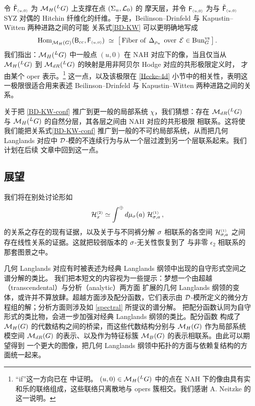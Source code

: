 令 $\check{\mathsf{F}}_{\scriptscriptstyle(u,0)}$ 为 $\mathcal{M}_{H}({}^LG)$ 上支撑在点 $(\Sigma_u,\mathcal{L}_0)$ 的
摩天层，并令 $\mathsf{F}_{\scriptscriptstyle (u,0)}$ 为与 $\check{\mathsf{F}}_{\scriptscriptstyle(u,0)}$ SYZ 对偶的
Hitchin 纤维化的纤维。于是，Beilinson--Drinfeld 与 Kapustin--Witten 两种进路之间的可能
关系式\eqref{BD-KW} 可以更明确地写成
\begin{equation} \label{BD-KW-conf}
{\rm Hom}_{\mathcal{M}_H(G)}^{}(\mathsf{B}_{\rm cc},\mathsf{F}_{\scriptscriptstyle (u,0)})
\;\simeq\;
\big[\,
\text{Fiber of}\;\, \Delta_{\rho_u}\;\,\text{over}\;\,\mathcal{E}\in\mathrm{Bun}_G^{\rm vs}\,\big]\,.
\end{equation}
我们指出：$\mathcal{M}_{H}({}^LG)$ 中一般点 $(u,0)$ 在 NAH 对应下的像，当且仅当从
$\mathcal{M}_{H}({}^LG)$ 到 $\mathcal{M}_{dR}({}^LG)$ 的映射是用非阿贝尔 Hodge 对应的共形极限定义时，
才由某个 oper 表示。\footnote{“if”这一方向已在 \cite{DFKMMN} 中证明。
$(u,0)\in\mathcal{M}_{H}({}^LG)$ 中的点在 NAH 下的像由具有实和乐的联络组成，这些联络只离散地与
opers 簇相交。我们感谢 A. Neitzke 的这一说明。} 这一点，以及该极限在 \ref{Hecke-4d}
小节中的相关性，表明这一极限很适合用来表述 Beilinson--Drinfeld 与 Kapustin--Witten
两种进路之间的关系。

关于把 \eqref{BD-KW-conf} 推广到更一般的局部系统 $\chi$，我们猜想：存在
$\mathcal{M}_{dR}({}^LG)$ 与 $\mathcal{M}_{H}({}^LG)$ 的自然分层，其各层之间由 NAH 对应的共形极限
相联系。这将使我们能把关系式\eqref{BD-KW-conf} 推广到一般的不可约局部系统，从而把几何
Langlands 对应中 $\mathcal{D}$-模的不连续行为与从一个层过渡到另一个层联系起来。我们计划在后续
文章中回到这一点。

\subsection{展望}

我们将在别处讨论形如
\begin{equation}\label{spectral}
\mathcal{H}_{x}^{\scriptscriptstyle(2)}\simeq \int^{\oplus} d\mu_\sigma(a)\;\mathcal{H}_{\sigma,a}^{\scriptscriptstyle(1)}\,,
\end{equation}
的关系之存在的现有证据，以及关于与不同裤分解 $\sigma$ 相联系的各空间
$\mathcal{H}_{\sigma,a}^{\scriptscriptstyle(1)}$ 之间存在线性关系的证据。这就把较弱版本的 $\sigma$-无关性恢复到了
与非零 $\epsilon_2$ 相联系的那套图景之中。

几何 Langlands 对应有时被表述为经典 Langlands 纲领中出现的自守形式空间之谱分解的类比。
我们把本短文的内容视为一些提示：梦想一个由超越（transcendental）与分析（analytic）两方面
扩展的几何 Langlands 纲领的变体，或许并不算放肆。超越方面涉及配分函数，它们表示由
$\mathcal{D}$-模所定义的微分方程组的解；分析方面则涉及如 \eqref{spectral} 所提议的谱分解。
把配分函数认同为自守形式的类比物，会进一步加强对经典 Langlands 纲领的类比。配分函数
构成了 $\mathcal{M}_H(G)$ 的代数结构之间的桥梁，而这些代数结构分别与 $\mathcal{M}_H(G)$ 作为局部系统
模空间 $\mathcal{M}_{dR}(G)$ 的表示、以及作为特征标簇 $\mathcal{M}_B(G)$ 的表示相联系。由此可以期望得到
一个更大的图像，把几何 Langlands 纲领中拓扑的方面与依赖复结构的方面统一起来。

